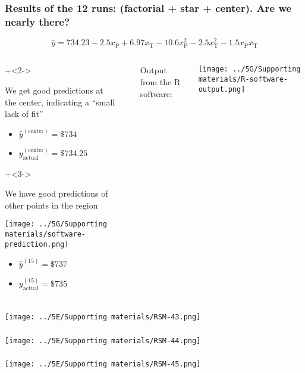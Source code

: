 \begin{frame}\frametitle{Results of the 12 runs: (factorial + star + center). Are we nearly there?}
	\[\hat{y} = 734.23 -2.5x_\text{P}    +    6.97  x_\text{T}    -10.6  x^2_\text{P}     -2.5  x^2_\text{T}     -1.5x_\text{P}x_\text{T}\]
	\begin{columns}[T]
			\begin{enumerate}
				\onslide+<2->{
					\item	We get good predictions at the center,
							indicating a ``small lack of fit''
							\begin{itemize}
								\item	$\hat{y}^{(\text{center})} = \$ 734$
								\item	$y^{(\text{center})}_\text{actual} = \$ 734.25$
							\end{itemize}
				}
				\onslide+<3->{
					\vspace{0.5cm}
					\item	We have good predictions of other points in the region
						\centerline{\texttt{[image: ../5G/Supporting materials/software-prediction.png]}}
						\vspace{-0.3cm}
						\begin{itemize}
							\item	$\hat{y}^{(15)} = \$ 737$
							\item	$y^{(15)}_\text{actual} = \$ 735$
						\end{itemize}
					}
			\end{enumerate}
			
			\rule[3mm]{0.01cm}{60mm}%
		
			Output from the R software:

			\centerline{\texttt{[image: ../5G/Supporting materials/R-software-output.png]}}

	\end{columns}
	
	
\end{frame}
\begin{frame}\frametitle{}
	\centerline{\texttt{[image: ../5E/Supporting materials/RSM-43.png]}}
\end{frame}
\begin{frame}\frametitle{}
	\centerline{\texttt{[image: ../5E/Supporting materials/RSM-44.png]}}
\end{frame}
\begin{frame}\frametitle{}
	\centerline{\texttt{[image: ../5E/Supporting materials/RSM-45.png]}}
\end{frame}

